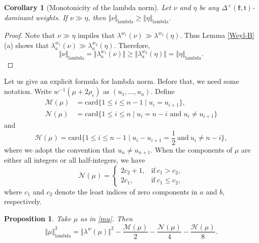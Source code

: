 \documentclass[11pt]{amsart}
\theoremstyle{plain}
\newtheorem{cor}[thm]{Corollary}
\newtheorem{prop}[thm]{Proposition}
\theoremstyle{definition}
\newcommand{\mfk}{\mathfrak{k}}
\newcommand{\mft}{\mathfrak{t}}
\newcommand{\caH}{\mathcal{H}}
\newcommand{\M}{\mathcal{M}}
\newcommand{\N}{\mathcal{N}}
\begin{document}
\begin{cor}[Monotonicity of the lambda norm]\label{lambda-up}
Let $\nu$ and $\eta$ be any $\Delta^+(\mfk, \mft)$-dominant weights. If $\nu\gg \eta$, then $\Vert \nu\Vert_{\mathrm{lambda}}\ge \Vert \eta\Vert_{\mathrm{lambda}}$.
\end{cor}
\begin{proof}
 Note that $\nu\gg\eta$  impiles that $\lambda^{w_1}(\nu)\gg \lambda^{w_2}(\eta)$.  Thus Lemma \ref{Weyl-B}(a) shows that $\lambda_a^{w_1}(\nu)\gg \lambda_a^{w_2}(\eta)$. Therefore,
	\[\Vert \nu\Vert_{\mathrm{lambda}}=\Vert \lambda_a^{w_1}(\nu)\Vert\ge \Vert \lambda_a^{w_2}(\eta)\Vert=\Vert \eta\Vert_{\mathrm{lambda}}.\]
\end{proof}

Let us give an explicit formula for lambda norm. Before that, we need some notation. Write  $w^{-1}(\mu+2\rho_c)$ as $(u_1,\dots,u_n)$. Define
\begin{align*}
	\M(\mu)&=\mathrm{card}\{1\le i\le n-1\mid u_i=u_{i+1}\},\\
	\mathcal{N}(\mu)&=\mathrm{card}\{1\le i\le n\mid \mbox{$u_i=n-i$ and $u_{i}\neq u_{i+1}$}\}
\end{align*}
and
\[\mathcal{H}(\mu)=\mathrm{card}\{1\le i\le n-1\mid u_i-u_{i+1}=\frac{1}{2}\ \mbox{and}\ u_i\neq n-i\},\]
where we adopt the convention that $u_n\neq u_{n+1}$. When the components of $\mu$ are either all integers or all half-integers, we have
\[\N(\mu)=\left\{
\begin{array}{ll}
	2c_2+1,& \mbox{if}\ c_1>c_2,\\
	2c_1, & \mbox{if}\ c_1\le c_2,
\end{array}
\right.\]
where $c_1$ and $c_2$ denote the least indices of zero components in $a$ and $b$, respectively.
\begin{prop}\label{lambda norm}
	 Take $\mu$ as in \eqref{mu}. Then
	\begin{equation}\label{lambda norm-strat}
		\Vert\mu\Vert_{\mathrm{lambda}}^2=\Vert \lambda^w(\mu)\Vert^2-\frac{\M(\mu)}{2}-\frac{\N(\mu)}{4}-\frac{\caH(\mu)}{8}.
	\end{equation}
\end{prop}
\end{document}
